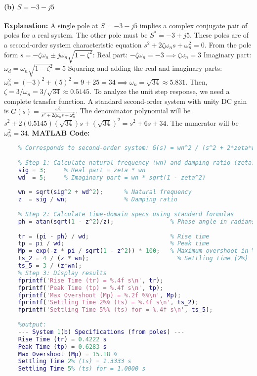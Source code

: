 \documentclass[a4paper,12pt]{article}
\begin{document}
	\paragraph{(b) $S = -3 - j5$}
	\textbf{Explanation:}
	A single pole at $S = -3 - j5$ implies a complex conjugate pair of poles for a real system. The other pole must be $S^* = -3 + j5$. These poles are of a second-order system characteristic equation $s^2 + 2\zeta\omega_n s + \omega_n^2 = 0$.
	From the pole form $s = -\zeta\omega_n \pm j\omega_n\sqrt{1-\zeta^2}$:
	Real part: $-\zeta\omega_n = -3 \implies \zeta\omega_n = 3$
	Imaginary part: $\omega_d = \omega_n\sqrt{1-\zeta^2} = 5$
	Squaring and adding the real and imaginary parts: $\omega_n^2 = (-3)^2 + (5)^2 = 9 + 25 = 34 \implies \omega_n = \sqrt{34} \approx 5.831$.
	Then, $\zeta = 3/\omega_n = 3/\sqrt{34} \approx 0.5145$.
	To analyze the unit step response, we need a complete transfer function. A standard second-order system with unity DC gain is $G(s) = \frac{\omega_n^2}{s^2 + 2\zeta\omega_n s + \omega_n^2}$.
	The denominator polynomial will be $s^2 + 2(0.5145)(\sqrt{34})s + (\sqrt{34})^2 = s^2 + 6s + 34$.
	The numerator will be $\omega_n^2 = 34$.
	\newpage
	\textbf{MATLAB Code:}
	\begin{lstlisting}[language=Matlab, caption=MATLAB Code for Problem 1(b)]
	% Given pole: S = -3 - j5
	% Corresponds to second-order system: G(s) = wn^2 / (s^2 + 2*zeta*wn*s + wn^2)
	
	% Step 1: Calculate natural frequency (wn) and damping ratio (zeta)
	sig = 3;     % Real part = zeta * wn
	wd  = 5;     % Imaginary part = wn * sqrt(1 - zeta^2)
	
	wn = sqrt(sig^2 + wd^2);      % Natural frequency
	z  = sig / wn;                % Damping ratio
	
	% Step 2: Calculate time-domain specs using standard formulas
	ph = atan(sqrt(1 - z^2)/z);                % Phase angle in radians
	
	tr = (pi - ph) / wd;                       % Rise time
	tp = pi / wd;                              % Peak time
	Mp = exp(-z * pi / sqrt(1 - z^2)) * 100;   % Maximum overshoot in %
	ts_2 = 4 / (z * wn);                         % Settling time (2%)
	ts_5 = 3 / (z*wn);
	% Step 3: Display results
	fprintf('Rise Time (tr) = %.4f s\n', tr);
	fprintf('Peak Time (tp) = %.4f s\n', tp);
	fprintf('Max Overshoot (Mp) = %.2f %%\n', Mp);
	fprintf('Settling Time 2%% (ts) = %.4f s\n', ts_2);
	fprintf('Settling Time 5%% (ts) for = %.4f s\n', ts_5);
	
	%output:	
	--- System 1(b) Specifications (from poles) ---
	Rise Time (tr) = 0.4222 s
	Peak Time (tp) = 0.6283 s
	Max Overshoot (Mp) = 15.18 %
	Settling Time 2% (ts) = 1.3333 s
	Settling Time 5% (ts) for = 1.0000 s
	\end{lstlisting}
\end{document}
